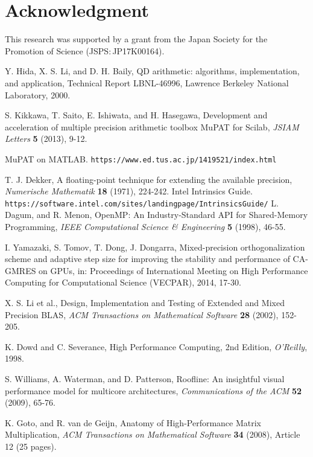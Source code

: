 \documentclass{IOS-Book-Article}
\begin{document}

\section*{Acknowledgment}

This research was supported by a grant from the Japan Society for the Promotion of Science (JSPS$\colon$JP17K00164).
\begin{thebibliography}{99}
 Y. Hida, X. S. Li, and D. H. Baily, QD arithmetic: algorithms, implementation, and application, Technical Report LBNL-46996, Lawrence Berkeley National Laboratory, 2000.

 S. Kikkawa, T. Saito, E. Ishiwata, and H. Hasegawa, Development and acceleration of multiple precision arithmetic toolbox MuPAT for Scilab, {\it JSIAM Letters} {\bf 5} (2013), 9-12. 

 MuPAT on MATLAB. {\tt https://www.ed.tus.ac.jp/1419521/index.html}

 T. J. Dekker, A floating-point technique for extending the available precision, {\it Numerische Mathematik} {\bf 18} (1971), 224-242. 
 Intel Intrinsics Guide. {\tt https://software.intel.com/sites/landingpage/IntrinsicsGuide/}
 L. Dagum, and R. Menon, OpenMP: An Industry-Standard API for Shared-Memory Programming, {\it IEEE Computational Science \& Engineering} {\bf 5} (1998), 46-55. 

I. Yamazaki, S. Tomov, T. Dong, J. Dongarra, Mixed-precision orthogonalization scheme and adaptive step size for improving the stability and performance of CA-GMRES on GPUs, in: Proceedings of International Meeting on High Performance Computing for Computational Science (VECPAR), 2014, 17-30.

 X. S. Li et al., Design, Implementation and Testing of Extended and Mixed Precision BLAS, {\it ACM Transactions on Mathematical Software} {\bf 28} (2002), 152-205.

 K. Dowd and C. Severance, High Performance Computing, 2nd Edition, {\it O'Reilly}, 1998.

 S. Williams, A. Waterman, and D. Patterson, Roofline: An insightful visual performance model for multicore architectures, {\it Communications of the ACM} {\bf 52} (2009),  65-76.

 K. Goto, and R. van de Geijn, Anatomy of High-Performance Matrix Multiplication, {\it ACM Transactions on Mathematical Software} {\bf 34} (2008), Article 12 (25 pages).

\end{thebibliography}
\end{document}
